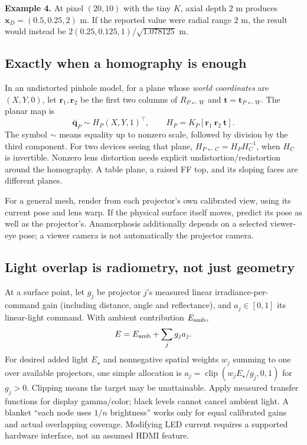\documentclass[11pt,a4paper]{article}
\newcommand{\Rot}[2]{R_{#1\leftarrow #2}}
\newcommand{\tr}[2]{\bm{t}_{#1\leftarrow #2}}
\newcommand{\pt}[1]{\bm{x}_{#1}}
\begin{document}
\textbf{Example 4.} At pixel $(20,10)$ with the tiny $K$,
axial depth $2$ m produces $\pt{D}=(0.5,0.25,2)$ m.
If the reported value were radial range $2$ m, the result would instead be
$2(0.25,0.125,1)/\sqrt{1.078125}$ m.

\subsection{Exactly when a homography is enough}
In an undistorted pinhole model, for a plane whose \emph{world coordinates}
are $(X,Y,0)$, let $\bm{r}_1,\bm{r}_2$ be the first two columns of
$\Rot{P}{W}$ and $\bm{t}=\tr{P}{W}$.
The planar map is
\begin{equation}
\bar{\bm{q}}_P\sim
H_P(X,Y,1)^\top,\qquad
H_P=K_P[\bm{r}_1\ \bm{r}_2\ \bm{t}].
\end{equation}
The symbol $\sim$ means equality up to nonzero scale, followed by division
by the third component. For two devices seeing that plane,
$H_{P\leftarrow C}=H_PH_C^{-1}$, when $H_C$ is invertible.
Nonzero lens distortion needs explicit undistortion/redistortion around
the homography. A table plane, a raised FF top, and its sloping faces are
different planes.

For a general mesh, render from each projector's own calibrated view,
using its current pose and lens warp. If the physical surface itself moves,
predict its pose as well as the projector's.
Anamorphosis additionally depends on a selected viewer-eye pose; a viewer
camera is not automatically the projector camera.

\subsection{Light overlap is radiometry, not just geometry}
At a surface point, let $g_j$ be projector $j$'s measured linear
irradiance-per-command gain (including distance, angle and reflectance),
and $a_j\in[0,1]$ its linear-light command. With ambient contribution
$E_{\rm amb}$,
\begin{equation}
E=E_{\rm amb}+\sum_j g_ja_j .
\label{eq:light}
\end{equation}
For desired added light $E_\star$ and nonnegative spatial weights
$w_j$ summing to one over available projectors, one simple allocation is
$a_j=\operatorname{clip}(w_jE_\star/g_j,0,1)$ for $g_j>0$.
Clipping means the target may be unattainable. Apply measured transfer
functions for display gamma/color; black levels cannot cancel ambient light.
A blanket ``each node uses $1/n$ brightness'' works only for equal calibrated
gains and actual overlapping coverage. Modifying LED current requires a
supported hardware interface, not an assumed HDMI feature.
\end{document}
